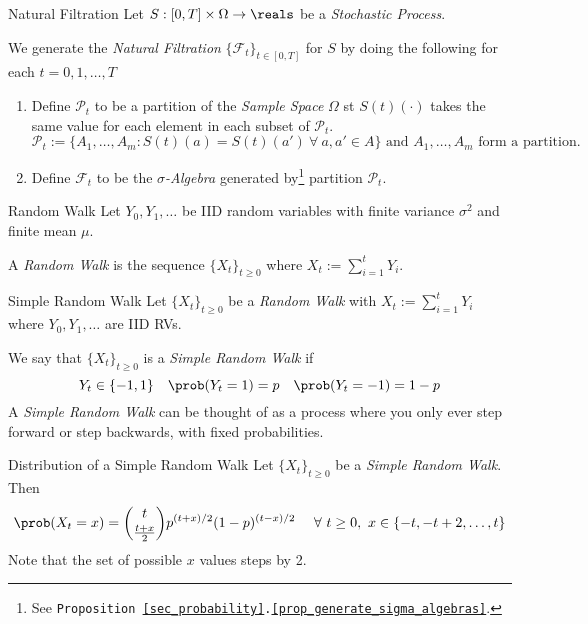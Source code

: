 \documentclass[11pt,a4paper]{article}
\begin{document}
  \begin{definition}{Natural Filtration}
    Let $S:[0,T]\times\Omega\to\reals$ be a \textit{Stochastic Process}.
    \par We generate the \textit{Natural Filtration} $\{\mathcal{F}_t\}_{t\in[0,T]}$ for $S$ by doing the following for each $t=0,1,\dots,T$
    \begin{enumerate}
      \item Define $\mathcal{P}_t$ to be a partition of the \textit{Sample Space} $\Omega$ st $S(t)(\cdot)$ takes the same value for each element in each subset of $\mathcal{P}_t$.
      \[ \mathcal{P}_t:=\big\{A_1,\dots,A_m:S(t)(a)=S(t)(a')\ \forall\ a,a'\in A\big\}\text{ and }A_1,\dots,A_m\text{ form a partition.} \]
      \item Define $\mathcal{F}_t$ to be the \textit{$\sigma$-Algebra} generated by\footnote{See \texttt{Proposition \ref{sec_probability}.\ref{prop_generate_sigma_algebras}}.} partition $\mathcal{P}_t$.
    \end{enumerate}
  \end{definition}

  \begin{definition}{Random Walk}
    Let $Y_0,Y_1,\dots$ be IID random variables with finite variance $\sigma^2$ and finite mean $\mu$.
    \par A \textit{Random Walk} is the sequence $\{X_t\}_{t\geq0}$ where $X_t:=\sum_{i=1}^tY_i$.
  \end{definition}

  \begin{definition}{Simple Random Walk}
    Let $\{X_t\}_{t\geq0}$ be a \textit{Random Walk} with $X_t:=\sum_{i=1}^tY_i$ where $Y_0,Y_1,\dots$ are IID RVs.
    \par We say that $\{X_t\}_{t\geq0}$ is a \textit{Simple Random Walk} if
    \[ Y_t\in\{-1,1\}\quad\prob(Y_t=1)=p\quad\prob(Y_t=-1)=1-p \]
    A \textit{Simple Random Walk} can be thought of as a process where you only ever step forward or step backwards, with fixed probabilities.
  \end{definition}

  \begin{theorem}{Distribution of a Simple Random Walk}\label{the_distribution_of_simple_random_walk}
    Let $\{X_t\}_{t\geq0}$ be a \textit{Simple Random Walk}. Then
    \[ \prob(X_t=x)={t \choose {\frac{t+x}2}}p^{(t+x)/2}(1-p)^{(t-x)/2}\quad\ \forall\ t\geq0,\ x\in\{-t,-t+2,\dots,t\} \]
    Note that the set of possible $x$ values steps by 2.
  \end{theorem}
\end{document}
